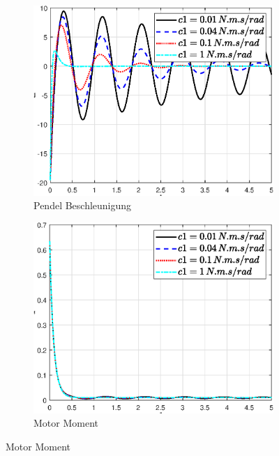 \begin{figure}
\begin{subfigure}[b]{0.49 \linewidth}
    \end{subfigure}
    \begin{subfigure}[b]{0.49 \linewidth}
        \includegraphics[width=\linewidth]{Bilder/5_sensi/fig/c1/theta_punkt_punkt.eps}
        \caption{Pendel Beschleunigung}
        \label{fig:c1_theta_punkt_punkt}
    \end{subfigure}
    \begin{subfigure}[b]{0.49\linewidth}
        \includegraphics[width=\linewidth]{Bilder/5_sensi/fig/c1/tau.eps}
        \caption{Motor Moment}
        \label{fig:c1_tau}
    \end{subfigure}

\end{figure}
